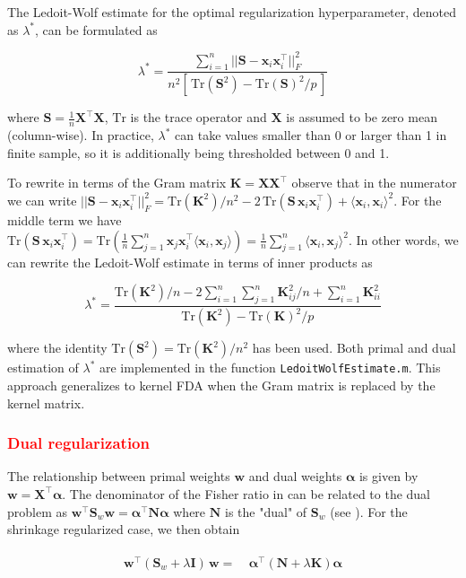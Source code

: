 \documentclass[utf8]{frontiersSCNS} %
\newcommand{\al}{\boldsymbol{\alpha}}
\newcommand{\w}{\mathbf{w}}
\newcommand{\x}{\mathbf{x}}
\newcommand{\I}{\mathbf{I}}
\newcommand{\K}{\mathbf{K}}
\renewcommand{\S}{\mathbf{S}}
\newcommand{\Tr}[1]{\text{Tr}(#1)}
\newcommand{\X}{\mathbf{X}}
\newcommand{\ttt}[1]{\texttt{#1}}
\newcommand{\red}[1]{\textcolor{red}{#1}}
\begin{document}
The Ledoit-Wolf estimate \citep{Ledoit2003HoneyMatrix,Blankertz2011} for the optimal regularization hyperparameter, denoted as $\lambda^*$, can be formulated as 

\begin{equation}\label{eq:LedoitWolf}
\lambda^* = \frac{\sum_{i=1}^n ||\S - \x_i\x_i^\top||_F^2}%
{n^2 [\,\Tr{\S^2} - \Tr{\S}^2/p\,]}
\end{equation}

where $\mathbf{S}= \frac{1}{n}\X^\top\X$, $\text{Tr}$ is the trace operator and $\X$ is assumed to be zero mean (column-wise). In practice, $\lambda^*$ can take values smaller than 0 or larger than 1 in finite sample, so it is additionally being thresholded between 0 and 1. 

To rewrite  in terms of the Gram matrix $\K= \X\X^\top$ observe that in the numerator we can write $||\S - \x_i\x_i^\top||_F^2 = \Tr{\K^2}/n^2 - 2\,\Tr{\S\,\x_i\x_i^\top} + \langle\x_i,\x_i\rangle^2$. For the middle term we have $\Tr{\S\,\x_i\x_i^\top} = \Tr{\frac{1}{n}\sum_{j=1}^n \x_j\x_i^\top\langle\x_i,\x_j\rangle} = \frac{1}{n}\sum_{j=1}^n \langle\x_i,\x_j\rangle^2$. In other words, we can rewrite the Ledoit-Wolf estimate in terms of inner products as 

\begin{equation}\label{eq:LedoitWolfDual}
\lambda^* = \frac{\Tr{\K^2}/n - 2\sum_{i=1}^n\sum_{j=1}^n \K_{ij}^2/n + \sum_{i=1}^n \K_{ii}^2 }%
{\Tr{\K^2} - \Tr{\K}^2/p}
\end{equation}

where the identity $\Tr{\S^2} = \Tr{\K^2}/n^2$ has been used. Both primal and dual estimation of $\lambda^*$ are implemented in the function \ttt{LedoitWolfEstimate.m}. This approach generalizes to kernel FDA when the Gram matrix is replaced by the kernel matrix.


\red{\subsubsection{Dual regularization}}

The relationship between primal weights $\w$ and dual weights $\al$ is given by $\w = \X^\top\al$. The denominator of the Fisher ratio in  can be related to the dual problem as $\w^\top\S_w\w = \al^\top\mathbf{N}\al$ where $\mathbf{N}$ is the "dual" of $\S_w$ (see ). For the shrinkage regularized case, we then obtain 

\begin{align}
\begin{split}
\label{eq:dualLDA}
\w^\top(\S_w + \lambda\I)\,\w =&\ \al^\top(\mathbf{N} + \lambda\K)\al
\end{split}
\end{align}
\end{document}
